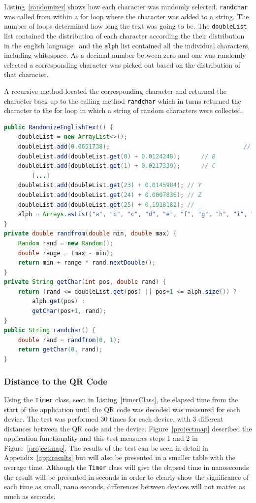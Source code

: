 Listing~\ref{randomizer} shows how each character was randomly selected. \texttt{randchar} was called from within a for loop where the character was added to a string. The number of loops determined how long the text was going to be. The \texttt{doubleList} list contained the distribution of each character according the their distribution in the english language~\cite{englishTextStat} and the \texttt{alph} list contained all the individual characters, including whitespace. As a decimal number between zero and one was randomly selected a corresponding character was picked out based on the distribution of that character.

A recursive method located the corresponding character and returned the character back up to the calling method \texttt{randchar} which in turns returned the character to the for loop in which a string of random characters were collected.

\newpage
\begin{lstlisting}[language=Java, caption={The randomizer class}, label=randomizer]
public RandomizeEnglishText() {
	doubleList = new ArrayList<>();
	doubleList.add(0.0651738);										// A
	doubleList.add(doubleList.get(0) + 0.0124248);		// B
	doubleList.add(doubleList.get(1) + 0.0217339);		// C
		[...]
	doubleList.add(doubleList.get(23) + 0.0145984);	// Y
	doubleList.add(doubleList.get(24) + 0.0007836);	// Z
	doubleList.add(doubleList.get(25) + 0.1918182);	// _
	alph = Arrays.asList("a", "b", "c", "d", "e", "f", "g", "h", "i", "j", "k", "k", "m", "n", "o", "p", "q", "r", "s", "t", "u", "v", "w", "x", "y", "z", " ");
}
private double randfrom(double min, double max) {
	Random rand = new Random();
	double range = (max - min);
	return min + range * rand.nextDouble();
}
private String getChar(int pos, double rand) {
	return (rand <= doubleList.get(pos) || pos+1 <= alph.size()) ?
		alph.get(pos) :
		getChar(pos+1, rand);
}
public String randchar() {
	double rand = randfrom(0, 1);
	return getChar(0, rand);
}
\end{lstlisting}

\subsubsection{Distance to the QR Code}

Using the \texttt{Timer} class, seen in Listing~\ref{timerClass}, the elapsed time from the start of the application until the QR code was decoded was measured for each device. The test was performed 30 times for each device, with 3 different distances between the QR code and the device. Figure~\ref{projectmap} described the application functionality and this test measures steps 1 and 2 in Figure~\ref{projectmap}. The results of the test can be seen in detail in Appendix~\ref{app:results} but will also be presented in a smaller table with the average time. 
Although the \texttt{Timer} class will give the elapsed time in nanoseconds the result will be presented in seconds in order to clearly show the significance of each time as small, nano seconds, differences between devices will not matter as much as seconds.

